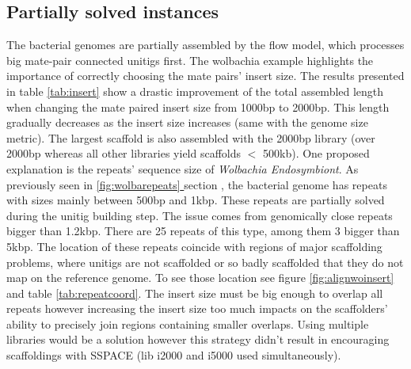 \documentclass[12pt, twocolumn]{article}
\newcommand*{\fulleref}[1]{\hyperref[{#1}]{\autoref*{#1} \nameref*{#1}}}
\begin{document}
\clearpage
\subsection{Partially solved instances}
The bacterial genomes are partially assembled by the flow model, which processes big mate-pair connected unitigs first. The wolbachia example highlights the importance of correctly choosing the mate pairs' insert size. The results presented in table \ref{tab:insert} show a drastic improvement of the total assembled length when changing the mate paired insert size from 1000bp to 2000bp. This length gradually decreases as the insert size increases (same with the genome size metric). The largest scaffold is also assembled with the 2000bp library (over 2000bp whereas all other libraries yield scaffolds $<$ 500kb). One proposed explanation is the repeats' sequence size of \textit{Wolbachia Endosymbiont}. As previously seen in \fulleref{fig:wolbarepeats} section  , the bacterial genome has repeats with sizes mainly between 500bp and 1kbp. These repeats are partially solved during the unitig building step. The issue comes from genomically close repeats bigger than 1.2kbp. There are 25 repeats of this type, among them 3 bigger than 5kbp. The location of these repeats coincide with regions of major scaffolding problems, where unitigs are not scaffolded or so badly scaffolded that they do not map on the reference genome. To see those location see figure \ref{fig:alignwoinsert} and table \ref{tab:repeatcoord}. The insert size must be big enough to overlap all repeats however increasing the insert size too much impacts on the scaffolders' ability to precisely join regions containing smaller overlaps. Using multiple libraries would be a solution however this strategy didn't result in encouraging scaffoldings with SSPACE (lib i2000 and i5000 used simultaneously). 
\end{document}
